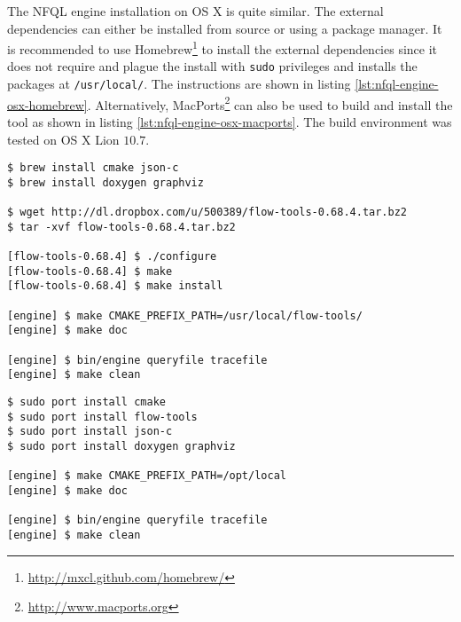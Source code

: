 The \ac{NFQL} engine installation on OS X is quite similar. The external
dependencies can either be installed from source or using a package manager.
It is recommended to use
Homebrew\footnote{\url{http://mxcl.github.com/homebrew/}} to install the
external dependencies  since it does not require
and plague the install with \texttt{sudo} privileges and installs the packages
at \texttt{/usr/local/}. The instructions are shown in listing
\ref{lst:nfql-engine-osx-homebrew}. Alternatively,
MacPorts\footnote{\url{http://www.macports.org}} can also be used to build and
install the tool as shown in listing \ref{lst:nfql-engine-osx-macports}. The build
environment was tested on OS X Lion $10.7$.

\begin{lstlisting}
$ brew install cmake json-c
$ brew install doxygen graphviz

$ wget http://dl.dropbox.com/u/500389/flow-tools-0.68.4.tar.bz2
$ tar -xvf flow-tools-0.68.4.tar.bz2

[flow-tools-0.68.4] $ ./configure
[flow-tools-0.68.4] $ make
[flow-tools-0.68.4] $ make install

[engine] $ make CMAKE_PREFIX_PATH=/usr/local/flow-tools/
[engine] $ make doc

[engine] $ bin/engine queryfile tracefile
[engine] $ make clean
\end{lstlisting}

\begin{lstlisting}
$ sudo port install cmake
$ sudo port install flow-tools
$ sudo port install json-c
$ sudo port install doxygen graphviz

[engine] $ make CMAKE_PREFIX_PATH=/opt/local
[engine] $ make doc

[engine] $ bin/engine queryfile tracefile
[engine] $ make clean
\end{lstlisting}


